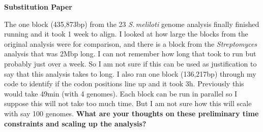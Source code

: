 \documentclass[12pt]{article}
\newcommand{\smel}{\textit{S.\,meliloti}\xspace}
\newcommand{\p}{progressiveMauve\xspace}
\newcommand{\strep}{\textit{Streptomyces}\xspace}
\newcommand{\ecol}{\textit{E.\,coli}\xspace}
\newcommand{\ecoli}{\textit{Escherichia coli}\xspace}
\newcommand{\pa}{pSymA\xspace}
\newcommand{\dn}{\textit{dN}\xspace}
\begin{document}

\textbf{Substitution Paper}

The one block (435,873bp) from the 23 \smel genome analysis finally finished running and it took 1 week to align.
I looked at how large the blocks from the original analysis were for comparison, and there is a block from the \strep analysis that was 2Mbp long.
I can not remember how long that took to run but probably just over a week.
So I am not sure if this can be used as justification to say that this analysis takes to long.
I also ran one block (136,217bp) through my code to identify if the codon positions line up and it took 3h. 
Previously this would take 49min (with 4 genomes).
Each block can be run in parallel so I suppose this will not take too much time. But I am not sure how this will scale with say 100 genomes.
\textbf{What are your thoughts on these preliminary time constraints and scaling up the analysis?}
\end{document}
